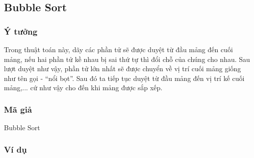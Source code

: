 \subsection{Bubble Sort}

\subsubsection{Ý tưởng}

Trong thuật toán này, dãy các phần tử sẽ được duyệt từ đầu mảng đến 
cuối mảng, nếu hai phần tử kề nhau bị sai thứ tự thì đổi chỗ của chúng 
cho nhau. Sau lượt duyệt như vậy, phần tử lớn nhất sẽ được chuyển về 
vị trí cuối mảng giống như tên gọi - “nổi bọt”. Sau đó ta tiếp tục 
duyệt từ đầu mảng đến vị trí kế cuối mảng,... cứ như vậy cho đến khi 
mảng được sắp xếp.

\subsubsection{Mã giả}

\begin{algorithm}[H]
	\caption{Bubble Sort}
\end{algorithm}

\subsubsection{Ví dụ}

